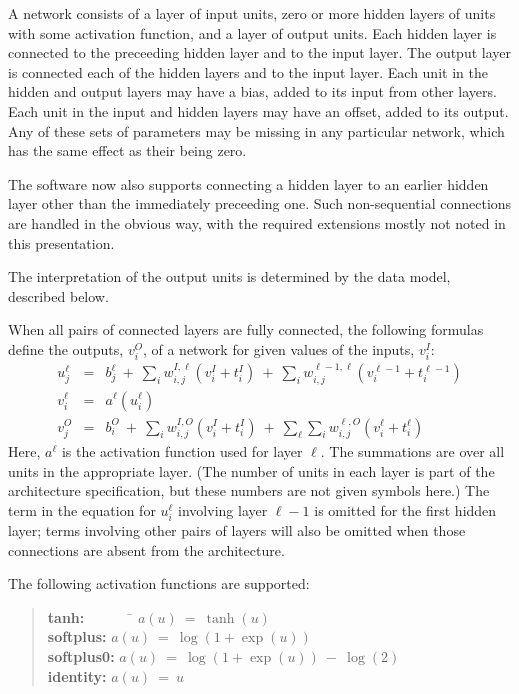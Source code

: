 \documentclass{report}[11pt]
\def\beq{\begin{eqnarray}}
\def\eeq{\end{eqnarray}}
\begin{document}
A network consists of a layer of input units, zero or more hidden
layers of units with some activation function, and a layer of output
units.  Each hidden layer is connected to the preceeding hidden layer
and to the input layer.  The output layer is connected each of the
hidden layers and to the input layer.  Each unit in the hidden and
output layers may have a bias, added to its input from other layers.
Each unit in the input and hidden layers may have an offset, added to
its output.  Any of these sets of parameters may be missing in any
particular network, which has the same effect as their being zero.

The software now also supports connecting a hidden layer to an
earlier hidden layer other than the immediately preceeding one.  Such
non-sequential connections are handled in the obvious way, with 
the required extensions mostly not noted in this presentation.

The interpretation of the output units is determined by the data
model, described below.

When all pairs of connected layers are fully connected, the following 
formulas define the outputs, $v^O_i$, of a network for given values 
of the inputs, $v^I_i$:\beq
  u^{\ell}_j & = & b^{\ell}_j \ +\ \sum_i w^{I,\ell}_{i,j} (v^I_i+t^I_i) 
                   \ +\ \sum_i w^{\ell-1,\ell}_{i,j} (v^{\ell-1}_i+t^{\ell-1}_i)
     \label{func1} \\[3pt]
  v^{\ell}_i & = & a^{\ell}(u^{\ell}_i) \label{func2} \\[5pt]
  v^O_j\!    & = & b^O_i \ +\ \sum_i w^{I,O}_{i,j} (v^I_i+t^I_i) 
             \ +\ \sum_{\ell} \sum_i w^{\ell,O}_{i,j} (v^{\ell}_i+t^{\ell}_i)
\label{func3}\eeq%
Here, $a^{\ell}$ is the activation function used for layer $\ell$.
The summations are over all units in the appropriate layer.  (The
number of units in each layer is part of the architecture
specification, but these numbers are not given symbols here.)  The
term in the equation for $u^{\ell}_i$ involving layer $\ell\!-\!1$ is
omitted for the first hidden layer; terms involving other pairs of
layers will also be omitted when those connections are absent from the
architecture.

The following activation functions are supported:\vspace{-22pt}
\begin{quotation}\noindent
\begin{tabbing}
{\bf tanh:}\ \ \ \ \ \ \ \= $a(u)\ =\ \tanh(u)$\\[3pt]
{\bf softplus:}\> $a(u)\ =\ \log(1+\exp(u))$\\[3pt]
{\bf softplus0:}\> $a(u)\ =\ \log(1+\exp(u))\ -\ \log(2)$\\[3pt]
{\bf identity:}\> $a(u)\ =\ u$\vspace{-5pt}
\end{tabbing}
\end{quotation}
\end{document}
